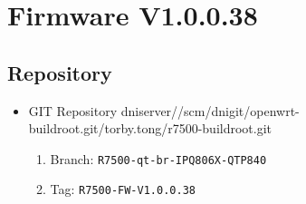 \documentclass[12pt]{report}
\newcommand{\tlabel}[1]{
  \label{#1}%
  }
\begin{document}
\section{Firmware V1.0.0.38}

\tlabel{sec:1-0-1}
\subsection{Repository}
\begin{itemize}
	\item GIT Repository dniserver//scm/dnigit/openwrt-buildroot.git/torby.tong/r7500-buildroot.git
	\begin{enumerate}
		\item Branch: \texttt{R7500-qt-br-IPQ806X-QTP840}
                \item Tag: \texttt{R7500-FW-V1.0.0.38}
	\end{enumerate}
\end{itemize}
\end{document}
